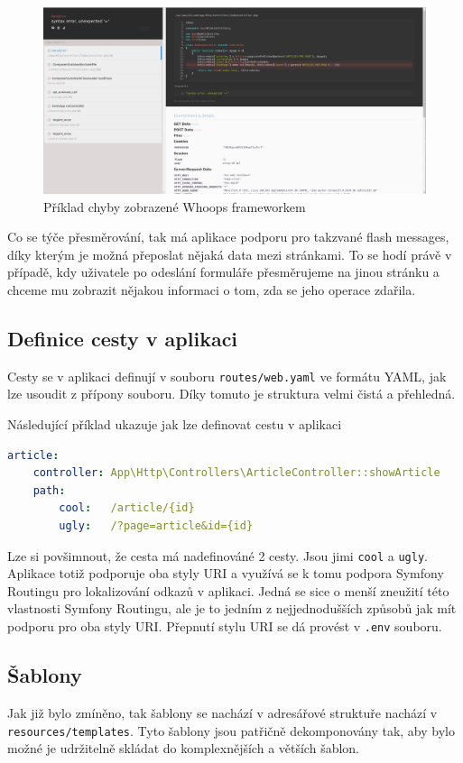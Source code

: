 \documentclass[12pt, a4paper]{article}
\begin{document}
    \begin{figure}
		\includegraphics[width=\textwidth]{whoops_framework.png}
		\caption{Příklad chyby zobrazené Whoops frameworkem} \label{whoops_framework}
	\end{figure}

    Co se týče přesměrování, tak má aplikace podporu pro takzvané flash messages, díky kterým je možná přeposlat nějaká data mezi stránkami. To se hodí právě v případě, kdy uživatele po odeslání formuláře přesměrujeme na jinou stránku a chceme mu zobrazit nějakou informaci o tom, zda se jeho operace zdařila.

    \subsection{Definice cesty v aplikaci}
    Cesty se v aplikaci definují v souboru {\tt routes/web.yaml} ve formátu YAML, jak lze usoudit z přípony souboru. Díky tomuto je struktura velmi čistá a přehledná.

    Následující příklad ukazuje jak lze definovat cestu v aplikaci
    \begin{lstlisting}[language=yaml]
article:
    controller: App\Http\Controllers\ArticleController::showArticle
    path:
        cool:   /article/{id}
        ugly:   /?page=article&id={id}
	\end{lstlisting}

	Lze si povšimnout, že cesta má nadefinováné 2 cesty. Jsou jimi {\tt cool} a {\tt ugly}. Aplikace totiž podporuje oba styly URI a využívá se k tomu podpora Symfony Routingu pro lokalizování odkazů v aplikaci. Jedná se sice o menší zneužití této vlastnosti Symfony Routingu, ale je to jedním z nejjednodušších způsobů jak mít podporu pro oba styly URI. Přepnutí stylu URI se dá provést v {\tt .env} souboru.

	\subsection{Šablony}
	Jak již bylo zmíněno, tak šablony se nachází v adresářové struktuře nachází v {\tt resources/templates}. Tyto šablony jsou patřičně dekomponovány tak, aby bylo možné je udržitelně skládat do komplexnějších a větších šablon.
\end{document}
